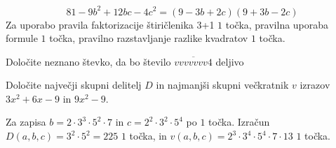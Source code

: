 \documentclass[addpoints]{exam}
\begin{document}
\begin{questions}
\begin{parts}
        \begin{solution}[3cm]
            $$81-9b^2+12bc-4c^2=(9-3b+2c)(9+3b-2c)$$
            Za uporabo pravila faktorizacije štiričlenika 3+1 $1$ točka, pravilna uporaba formule $1$ točka, pravilno razstavljanje razlike kvadratov $1$ točka.
        \end{solution}


    \end{parts}



    \question
    Določite neznano števko, da bo število $\overline{vvvvvvv4}$ deljivo




    \question[4]
    Določite največji skupni delitelj $D$ in najmanjši skupni večkratnik $v$ izrazov $3x^2+6x-9$ in $9x^2-9$.

    \begin{solution}[6cm]
        Za zapisa $b=2\cdot 3^3\cdot 5^2\cdot 7$ in $c=2^2\cdot 3^2\cdot 5^4$ po $1$ točka. 
        Izračun $D(a,b,c)=3^2\cdot 5^2=225$ $1$ točka, in $v(a,b,c)=2^3\cdot 3^4\cdot 5^4\cdot 7\cdot 13$ $1$ točka.
    \end{solution}
    

\end{questions}
\end{document}
